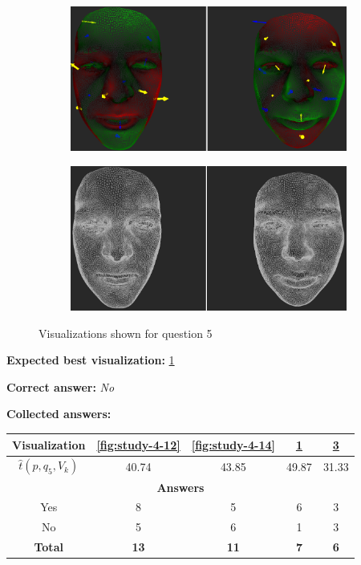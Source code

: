 \begin{figure}[h]
\begin{subfigure}{0.49\textwidth}
\includegraphics[width=\textwidth]{./img-study/pair11.PNG}
\caption{}
\label{fig:study-4-11}
\end{subfigure}
\begin{subfigure}{0.49\textwidth}
\includegraphics[width=\textwidth]{./img-study/pair13.PNG}
\caption{}
\label{fig:study-4-13}
\end{subfigure}
\caption{Visualizations shown for question 5}
\end{figure}
\medskip

{\bf Expected best visualization:} \ref{fig:study-4-11}
\medskip

{\bf Correct answer:} {\it No}
\medskip

{\bf Collected answers:}

\begin{center}
\begin{tabular}{| c | c | c | c | c |}
	\hline
	Visualization & \ref{fig:study-4-12} & \ref{fig:study-4-14} & \ref{fig:study-4-11} & \ref{fig:study-4-13}\\ \hline
	\(\widehat{t}(p, q_5, V_k)\) & 40.74 & 43.85 & 49.87 & 31.33\\ \hline
	\multicolumn{5}{|c|}{\bf Answers} \\ \hline
	Yes & 8 & 5 & 6 & 3\\ \hline
	\rowcolor{yellow!30} No & 5 & 6 & 1 & 3\\ \hline
	{\bf Total} & {\bf 13} & {\bf 11} & {\bf 7} & {\bf 6}\\ \hline
\end{tabular}
\end{center}
\clearpage

